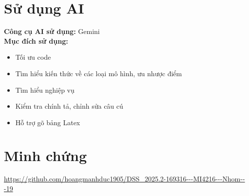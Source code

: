 \documentclass[a4paper,11pt]{article}
\begin{document}
\section{Sử dụng AI}
\textbf{Công cụ AI sử dụng: }Gemini\\
\textbf{Mục đích sử dụng: }
\begin{itemize}
    \item Tối ưu code
    \item Tìm hiểu kiến thức về các loại mô hình, ưu nhược điểm
    \item Tìm hiểu nghiệp vụ
    \item Kiểm tra chính tả, chỉnh sửa câu cú
    \item Hỗ trợ gõ bảng Latex
\end{itemize} 
\section{Minh chứng}
\url{https://github.com/hoangmanhduc1905/DSS\_2025.2-169316---MI4216---Nhom---19}
\end{document}
